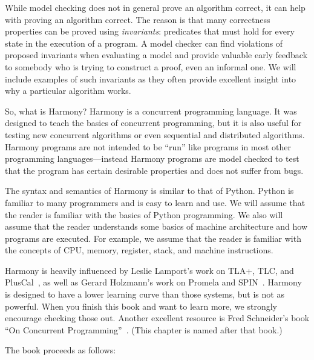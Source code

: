 \documentclass{report}
\begin{document}
While model checking does not in general prove an algorithm correct,
it can help with proving an algorithm correct.
The reason is that many correctness properties can be proved using
\emph{invariants}:
%
predicates that must hold for every state in the
execution of a program.  A model checker can find violations of
proposed invariants when evaluating a model and provide valuable early
feedback to somebody who is trying to construct a proof, even an
informal one.
We will include examples
of such invariants as they often provide excellent insight into
why a particular algorithm works.

So, what is Harmony?
Harmony is a concurrent programming language.  It was designed to teach
the basics of concurrent programming, but it is also useful for
testing new concurrent algorithms or even sequential and distributed
algorithms.  Harmony programs are not intended to be ``run'' like programs
in most other programming languages---instead Harmony programs are
model checked to test that the program has certain desirable
properties and does not suffer from bugs.

The syntax and semantics of Harmony is similar to that of Python.
Python is familiar to many programmers and is easy to learn and
use.  We will assume that the reader is familiar with the basics
of Python programming.  We also will assume that the reader
understands some basics of machine architecture and how programs
are executed.  For example, we assume that the reader is familiar
with the concepts of CPU, memory, register, stack, and machine
instructions.

Harmony is heavily influenced by Leslie Lamport's work on
TLA+, TLC, and PlusCal~\cite{Lamport02, Lamport09}, as well as
Gerard Holzmann's work on Promela and SPIN~\cite{SPIN}.
Harmony is designed to have a lower learning curve than those
systems, but is not as powerful.  When you finish this book
and want to learn more, we strongly encourage checking
those out.
Another excellent resource is Fred Schneider's book ``On
Concurrent Programming''~\cite{Schneider97}.
(This chapter is named after that book.)

The book proceeds as follows:
\end{document}
